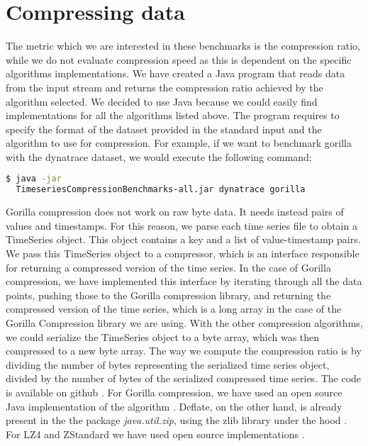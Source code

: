 \section{Compressing data}
The metric which we are interested in these benchmarks is the compression ratio, while we do not evaluate compression speed
as this is dependent on the specific algorithms implementations.
We have created a Java program that reads data from the input stream and returns the compression ratio
achieved by the algorithm selected. We decided to use Java because we could easily find implementations for
all the algorithms listed above.
The program requires to specify the format of the dataset provided in the standard input and the
algorithm to use for compression. For example, if we want to benchmark gorilla with the dynatrace dataset,
we would execute the following command:
\lstset{
    basicstyle=\small,
    stringstyle=\ttfamily
}
\begin{lstlisting}[language=bash]
  $ java -jar
  TimeseriesCompressionBenchmarks-all.jar dynatrace gorilla
\end{lstlisting}
Gorilla compression does not work on raw byte data. It needs instead pairs of values and timestamps.
For this reason, we parse each time series file to obtain a TimeSeries object.
This object contains a key and a list of value-timestamp pairs.  
We pass this TimeSeries object to a compressor, which is an interface responsible for returning a compressed version of the time series.
In the case of Gorilla compression, we have implemented this interface by iterating through all
the data points, pushing those to the Gorilla compression library, and returning the compressed
version of the time series, which is a long array in the case of the Gorilla Compression library we are using.
With the other compression algorithms, we could serialize the TimeSeries
object to a byte array, which was then compressed to a new byte array. 
The way we compute the compression ratio is by dividing the number of bytes representing the serialized
time series object, divided by the number of bytes of the serialized compressed time series.
The code is available on github \cite{dovidio_2019_dovidiotscompressionthesis}.
For Gorilla compression, we have used an open source Java implementation of the algorithm
\cite{burmanm_2018_burmanmgorillatsc}. Deflate, on the other hand, is already present in the the package
\textit{java.util.zip}, using the zlib library under the hood \cite{a2019_deflater}.
For LZ4 and ZStandard we have used open source implementations \cite{lz4_2019_lz4lz4java}\cite{luben_2015_lubenzstdjni}.

